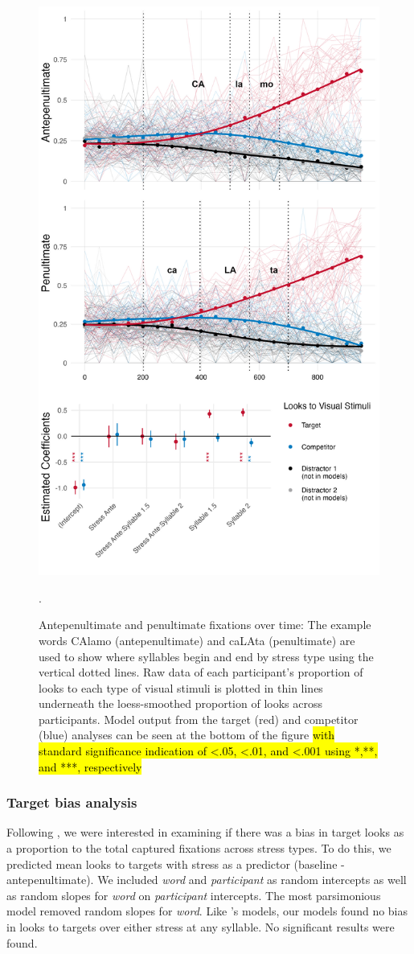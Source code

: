 \begin{figure}[H]
  \centering
  \includegraphics[width=0.6\linewidth]{visuals/pen_vs_anti_pen_id_combo.jpeg} %
  \caption{Antepenultimate and penultimate fixations over time: The example words CAlamo (antepenultimate) and caLAta (penultimate) are used to show where syllables begin and end by stress type using the vertical dotted lines. Raw data of each participant's proportion of looks to each type of visual stimuli is plotted in thin lines underneath the loess-smoothed proportion of looks across participants. Model output from the target (red) and competitor (blue) analyses can be seen at the bottom of the figure \hl{with standard significance indication of \textless .05, \textless .01, and \textless .001 using *,**, and ***, respectively}}. 
  \label{fig:raw_pen_vs_anti}
\end{figure}

\subsubsection{Target bias analysis}

Following \cite{Sulpizio_McQueen_2012}, we were interested in examining if there was a bias in target looks as a proportion to the total captured fixations across stress types. To do this, we predicted mean looks to targets with stress as a predictor (baseline - antepenultimate). We included \textit{word} and \textit{participant} as random intercepts as well as random slopes for \textit{word} on \textit{participant} intercepts. The most parsimonious model removed random slopes for \textit{word}. Like \cite{Sulpizio_McQueen_2012}'s models, our models found no bias in looks to targets over either stress at any syllable. No significant results were found.   


